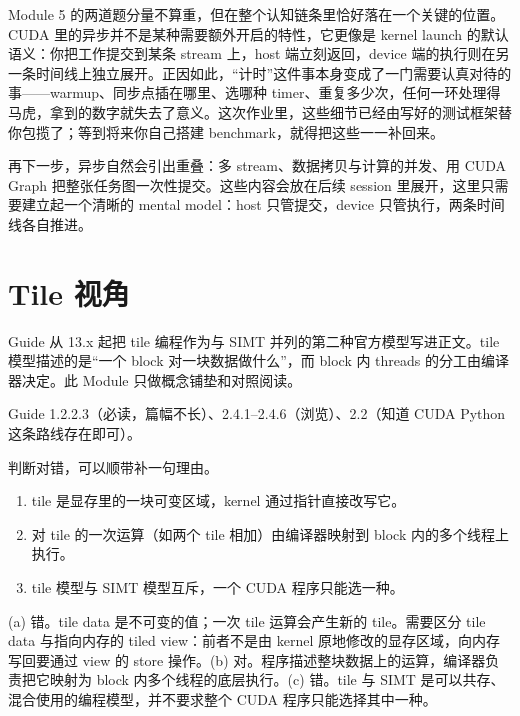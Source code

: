 \documentclass[11pt,a4paper,fontset=none]{ctexart}
\begin{document}
\begin{lookback}
Module 5 的两道题分量不算重，但在整个认知链条里恰好落在一个关键的位置。CUDA 里的异步并不是某种需要额外开启的特性，它更像是 kernel launch 的默认语义：你把工作提交到某条 stream 上，host 端立刻返回，device 端的执行则在另一条时间线上独立展开。正因如此，“计时”这件事本身变成了一门需要认真对待的事——warmup、同步点插在哪里、选哪种 timer、重复多少次，任何一环处理得马虎，拿到的数字就失去了意义。这次作业里，这些细节已经由写好的测试框架替你包揽了；等到将来你自己搭建 benchmark，就得把这些一一补回来。

再下一步，异步自然会引出重叠：多 stream、数据拷贝与计算的并发、用 CUDA Graph 把整张任务图一次性提交。这些内容会放在后续 session 里展开，这里只需要建立起一个清晰的 mental model：host 只管提交，device 只管执行，两条时间线各自推进。
\end{lookback}

\section{Tile 视角}

Guide 从 13.x 起把 tile 编程作为与 SIMT 并列的第二种官方模型写进正文。tile 模型描述的是“一个 block 对一块数据做什么”，而 block 内 threads 的分工由编译器决定。此 Module 只做概念铺垫和对照阅读。

\begin{reading}
Guide 1.2.2.3（必读，篇幅不长）、2.4.1--2.4.6（浏览）、2.2（知道 CUDA Python 这条路线存在即可）。
\end{reading}

判断对错，可以顺带补一句理由。
\begin{enumerate}[label=(\alph*)]
  \item tile 是显存里的一块可变区域，kernel 通过指针直接改写它。
  \item 对 tile 的一次运算（如两个 tile 相加）由编译器映射到 block 内的多个线程上执行。
  \item tile 模型与 SIMT 模型互斥，一个 CUDA 程序只能选一种。
\end{enumerate}

\begin{tcolorbox}[title={6.1 作答（讨论后整理）}]
(a) 错。tile data 是不可变的值；一次 tile 运算会产生新的 tile。需要区分 tile data 与指向内存的 tiled view：前者不是由 kernel 原地修改的显存区域，向内存写回要通过 view 的 store 操作。(b) 对。程序描述整块数据上的运算，编译器负责把它映射为 block 内多个线程的底层执行。(c) 错。tile 与 SIMT 是可以共存、混合使用的编程模型，并不要求整个 CUDA 程序只能选择其中一种。
\end{tcolorbox}
\end{document}
